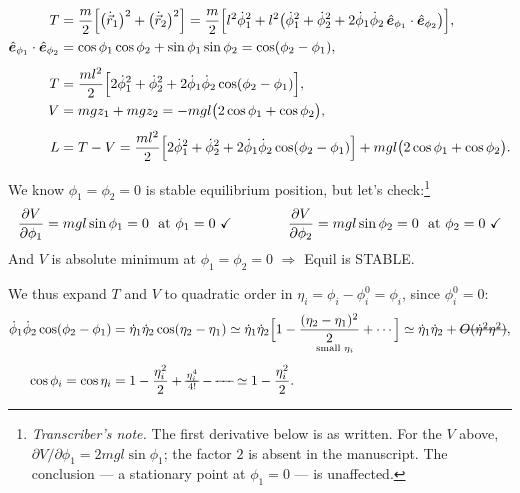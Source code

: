 \documentclass[11pt]{article}
\newcommand{\rmath}[1]{\text{\retracted{\ensuremath{#1}}}}
\newcommand{\tnote}[1]{\footnote{\emph{Transcriber's note.} #1}}
\begin{document}
\begin{align*}
  T &= \frac{m}{2}\Bigl[\bigl(\dot{\vec r}_1\bigr)^2 + \bigl(\dot{\vec r}_2\bigr)^2\Bigr]
     = \frac{m}{2}\Bigl[l^2\dot\phi_1^2
       + l^2\bigl(\dot\phi_1^2 + \dot\phi_2^2
       + 2\dot\phi_1\dot\phi_2\,\hat{\bm{e}}_{\phi_1}\cdot\hat{\bm{e}}_{\phi_2}\bigr)\Bigr],\\
  \hat{\bm{e}}_{\phi_1}\cdot\hat{\bm{e}}_{\phi_2}
    &= \cos\phi_1\cos\phi_2 + \sin\phi_1\sin\phi_2 = \cos(\phi_2-\phi_1),\\[4pt]
  T &= \frac{ml^2}{2}\Bigl[2\dot\phi_1^2 + \dot\phi_2^2
       + 2\dot\phi_1\dot\phi_2\cos(\phi_2-\phi_1)\Bigr],\\
  V &= mgz_1 + mgz_2 = -mgl\bigl(2\cos\phi_1 + \cos\phi_2\bigr),\\[4pt]
  L &= T - V = \frac{ml^2}{2}\Bigl[2\dot\phi_1^2 + \dot\phi_2^2
       + 2\dot\phi_1\dot\phi_2\cos(\phi_2-\phi_1)\Bigr]
       + mgl\bigl(2\cos\phi_1 + \cos\phi_2\bigr).
\end{align*}

We know $\phi_1 = \phi_2 = 0$ is stable equilibrium position, but let's
check:\tnote{The first derivative below is as written. For the $V$ above,
$\partial V/\partial\phi_1 = 2mgl\sin\phi_1$; the factor $2$ is absent in the
manuscript. The conclusion --- a stationary point at $\phi_1 = 0$ --- is
unaffected.}
\begin{equation*}
  \pd{V}{\phi_1} = mgl\sin\phi_1 = 0 \ \text{ at } \phi_1 = 0 \ \checkmark
  \qquad\qquad
  \pd{V}{\phi_2} = mgl\sin\phi_2 = 0 \ \text{ at } \phi_2 = 0 \ \checkmark
\end{equation*}
And $V$ is absolute minimum at $\phi_1 = \phi_2 = 0$ $\Rightarrow$ Equil is STABLE.

We thus expand $T$ and $V$ to quadratic order in
$\eta_i = \phi_i - \phi_i^{0} = \phi_i$, since $\phi_i^0 = 0$:
\begin{align*}
  \dot\phi_1\dot\phi_2\cos(\phi_2-\phi_1)
    &= \dot\eta_1\dot\eta_2\cos(\eta_2-\eta_1)
     \simeq \dot\eta_1\dot\eta_2
       \underset{\text{\scriptsize small }\eta_i}
       {\Bigl[1 - \frac{(\eta_2-\eta_1)^2}{2} + \cdots\Bigr]}
     \simeq \dot\eta_1\dot\eta_2 + \rmath{O(\dot\eta^2\eta^2)} ,\\[4pt]
  \cos\phi_i = \cos\eta_i
    &= 1 - \frac{\eta_i^2}{2} + \rmath{\frac{\eta_i^4}{4!}} - \rmath{\cdots}
     \simeq 1 - \frac{\eta_i^2}{2} .
\end{align*}
\end{document}
